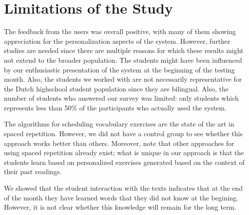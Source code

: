 


\section{Limitations of the Study}
\label{sec:limitations}

The feedback from the users was overall positive, with many of them showing appreciation for the personalization aspects of the system. 
However, further studies are needed since there are multiple reasons for which these results might not extend to the broader population. 
The students might have been influenced by our enthusiastic presentation of the system at the beginning of the testing month. 
Also, the students we worked with are not necessarily representative for the Dutch highschool student population since they are bilingual. 
Also, the number of students who answered our survey was limited: only \surveyrespondents students which represents less than 50\% of the participants who actually used the system.




The algorithms for scheduling vocabulary exercises are the state of the art in spaced repetition. However, we did not have a control group to see whether this approach works better than others. Moreover, note that other approaches for using spaced repetition already exist; what is unique in our approach is that the students learn based on personalized exercises generated based on the context of their past readings.

We showed that the student interaction with the texts indicates that at the end of the month they have learned words that they did not know at the begining. However, it is not clear whether this knowledge will remain for the long term. 


